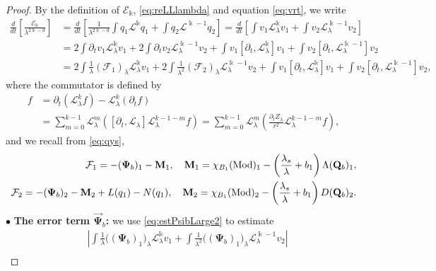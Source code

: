 \documentclass[11pt]{aims}
\theoremstyle{definition}
\numberwithin{equation}{section}
\begin{document}
\begin{proof} By the definition of ${\mathscr{E}}_\Bbbk$, \eqref{eq:reLLlambda} and equation \eqref{eq:vrt}, we write 
\begin{align}
\frac{d}{dt}\left[\frac{{\mathscr{E}}_{\Bbbk}}{\lambda^{2\Bbbk - d}}\right] & = \frac{d}{dt}\left[\frac{1}{\lambda^{2\Bbbk - d}}\int q_1{\mathscr{L}}^\Bbbk q_1 + \int q_2{\mathscr{L}}^{\Bbbk - 1}q_2 \right] = \frac{d}{dt}\left[\int v_1 {\mathscr{L}}_\lambda^{\Bbbk}v_1 + \int v_2{\mathscr{L}}_\lambda^{\Bbbk- 1}v_2 \right]\nonumber\\
& = 2\int {\partial_t} v_1{\mathscr{L}}_\lambda^{\Bbbk}v_1 + 2\int {\partial_t} v_2 {\mathscr{L}}_\lambda^{\Bbbk - 1}v_2 + \int v_1 [{\partial_t}, {\mathscr{L}}_\lambda^\Bbbk]v_1 + \int v_2 [{\partial_t}, {\mathscr{L}}_\lambda^{\Bbbk-1}]v_2\nonumber\\
& = 2\int \frac{1}{\lambda}({\mathcal{F}}_1)_\lambda {\mathscr{L}}_\lambda^\Bbbk v_1 + 2 \int \frac{1}{\lambda^2}({\mathcal{F}}_2)_\lambda{\mathscr{L}}_\lambda^{\Bbbk - 1}v_2 + \int v_1 [{\partial_t}, {\mathscr{L}}_\lambda^\Bbbk]v_1 + \int v_2 [{\partial_t}, {\mathscr{L}}_\lambda^{\Bbbk-1}]v_2, \label{eq:IDEk}
\end{align}
where the commutator is defined by
\begin{align}
[{\partial_t}, {\mathscr{L}}_\lambda^k]f &= {\partial_t}({\mathscr{L}}_\lambda^k f) - {\mathscr{L}}^k_\lambda ({\partial_t} f)\nonumber\\ 
& = \sum_{m = 0}^{k - 1}{\mathscr{L}}_\lambda^m\left([{\partial_t}, {\mathscr{L}}_\lambda] {\mathscr{L}}_\lambda^{k - 1 - m}f\right) = \sum_{m = 0}^{k - 1} {\mathscr{L}}_\lambda^m \left(\frac{{\partial_t} Z_\lambda}{r^2}{\mathscr{L}}_\lambda^{k - 1- m}f\right), \label{def:commu}
\end{align}
and we recall from \eqref{eq:qys},
\begin{align}
{\mathcal{F}}_1 = -(\mathbf{\Psi}_b)_1 - \mathbf{M}_1, \quad \mathbf{M}_1 = \chi_{B_1}(\textup{Mod})_1 - \left(\frac{\lambda_s}{\lambda}  + b_1\right)\Lambda (\mathbf{Q}_b)_1,\label{def:M1}\\
{\mathcal{F}}_2 = -(\mathbf{\Psi}_b)_2 - \mathbf{M}_2 +  L(q_1) - N(q_1), \quad \mathbf{M}_2 = \chi_{B_1}(\textup{Mod})_2 - \left(\frac{\lambda_s}{\lambda}  + b_1\right)D(\mathbf{Q}_b)_2.\label{def:M2}
\end{align}
$\bullet$ \textbf{The error term $\vec{\mathbf{\Psi}}_b$:} we use \eqref{eq:estPsibLarge2} to estimate 
\begin{align}
&\left|\int \frac{1}{\lambda}\big((\mathbf{\Psi}_b)_1\big)_\lambda {\mathscr{L}}_\lambda^\Bbbk v_1 + \int \frac{1}{\lambda^2}\big((\mathbf{\Psi}_b)_1\big)_\lambda{\mathscr{L}}_\lambda^{\Bbbk - 1}v_2\right|\nonumber\\

\end{align}
\end{proof}
\end{document}
